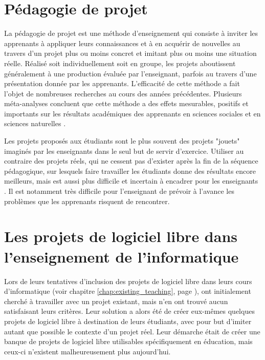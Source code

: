\section{Pédagogie de projet}


La pédagogie de projet est une méthode d'enseignement qui consiste à inviter les apprenants à appliquer leurs
connaissances et à en acquérir de nouvelles au travers d'un projet plus ou moins concret et imitant plus ou
moins une situation réelle. Réalisé soit individuellement soit en groupe, les projets aboutissent généralement
à une production évaluée par l'enseignant, parfois au travers d'une présentation donnée par les apprenants.
L'efficacité de cette méthode a fait l'objet de nombreuses recherches au cours des années précédentes.
Plusieurs méta-analyses concluent que cette méthode a des effets mesurables, positifs et importants sur les
résultats académiques des apprenants en sciences sociales et en sciences naturelles
.

Les projets proposés aux étudiants sont le plus souvent des projets "jouets" imaginés par les enseignants dans
le seul but de servir d'exercice. Utiliser au contraire des projets réels, qui ne cessent pas d'exister après
la fin de la séquence pédagogique, sur lesquels faire travailler les étudiants donne des résultats encore
meilleurs, mais est aussi plus difficile et incertain à encadrer pour les enseignants
. Il est notamment très difficile pour l'enseignant de prévoir à
l'avance les problèmes que les apprenants risquent de rencontrer.

\section{Les projets de logiciel libre dans l'enseignement de l'informatique}


Lors de leurs tentatives d'inclusion des projets de logiciel libre dans leurs cours d'informatique (voir
chapitre \ref{chap:existing_teaching}, page \pageref{teaching:ncsu}),  ont
initialement cherché à travailler avec un projet existant, mais n'en ont trouvé aucun satisfaisant leurs
critères. Leur solution a alors été de créer eux-mêmes quelques projets de logiciel libre à destination de
leurs étudiants, avec pour but d'imiter autant que possible le contexte d'un projet réel. Leur démarche était
de créer une banque de projets de logiciel libre utilisables spécifiquement en éducation, mais ceux-ci
n'existent malheureusement plus aujourd'hui.

